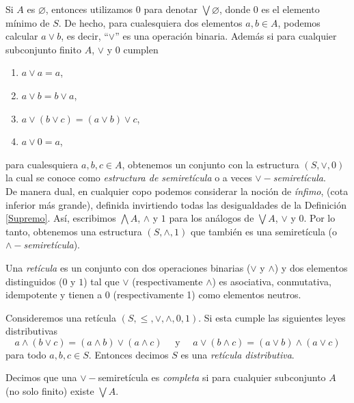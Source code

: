Si $A$ es $\varnothing$, entonces utilizamos $0$ para denotar $\bigvee \varnothing$, donde $0$ es el elemento mínimo de $S$. De hecho, para cualesquiera dos elementos $a, b\in A$, podemos calcular $a\vee b$, es decir, ``$\vee$'' es una operación binaria. Además si para cualquier subconjunto finito $A$, $\vee$ y $0$ cumplen

\begin{enumerate}
    \item $a\vee a=a$,
    \item $a\vee b= b\vee a$,
    \item $a\vee (b\vee c)=(a\vee b) \vee c$,
    \item $a\vee 0=a$,
\end{enumerate}

para cualesquiera $a,b,c\in A$, obtenemos un conjunto con la estructura $(S, \vee, 0)$ la cual se conoce como \emph{estructura de semiretícula} o a veces \emph{$\vee-$semiretícula}.\\

De manera dual, en cualquier copo podemos considerar la noción de \emph{ínfimo}, (cota inferior más grande), definida invirtiendo todas las desigualdades de la Definición \ref{Supremo}. Así, escribimos $\bigwedge A$, $\wedge$ y $1$ para los análogos de $\bigvee A$, $\vee$ y $0$. Por lo tanto, obtenemos una  estructura $(S, \wedge, 1)$ que también es una semiretícula (o \emph{$\wedge-$semiretícula}).

\begin{dfn}\label{Reticula}
Una \emph{retícula} es un conjunto con dos operaciones binarias ($\vee$ y $\wedge$) y dos elementos distinguidos ($0$ y $1$) tal que $\vee$ (respectivamente $\wedge$) es asociativa, conmutativa, idempotente y tienen a $0$ (respectivamente 1) como elementos neutros.
\end{dfn} 

\begin{dfn}\label{Reticuladistributiva}
Consideremos una retícula $(S, \leq, \vee, \wedge, 0, 1)$. Si esta  cumple las siguientes leyes distributivas
\[
a\wedge (b\vee c)=(a\wedge b)\vee (a\wedge c)\quad\mbox{ y }\quad a\vee (b\wedge c)=(a\vee b)\wedge (a\vee c)
\]
para todo $a, b, c\in S$. Entonces decimos $S$ es una \emph{retícula distributiva}.
\end{dfn}

\begin{dfn}\label{Semiretículacompleta}
Decimos que una $\vee-$semiretícula es \emph{completa} si para cualquier subconjunto $A$ (no solo finito) existe $\bigvee A$. 
\end{dfn}

